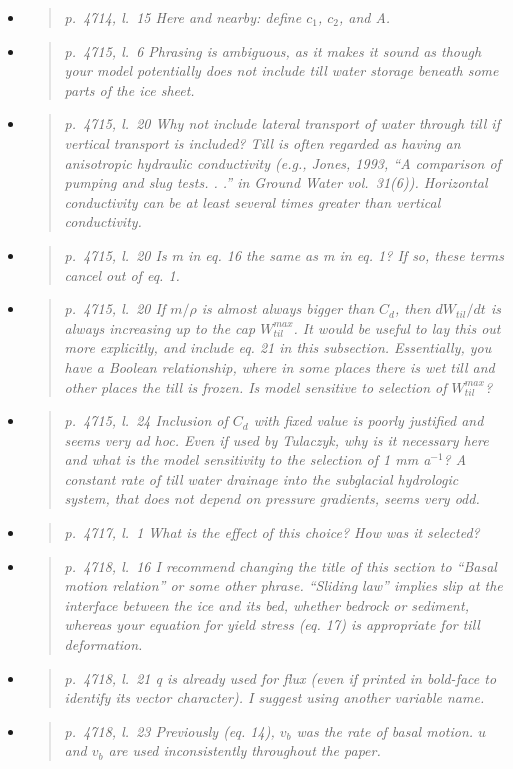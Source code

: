 \documentclass[11pt,reqno]{amsart}
\newcommand{\reply}[2]{
\medskip\medskip
\item  \begin{quote}
\emph{#1}
\end{quote}

\medskip
\noindent #2}
\begin{document}
\begin{itemize}
\reply{p.~4714, l.~15 Here and nearby: define $c_1$, $c_2$, and A.}
{}

\reply{p.~4715, l.~6 Phrasing is ambiguous, as it makes it sound as though your model
potentially does not include till water storage beneath some parts of the ice sheet.}
{}

\reply{p.~4715, l.~20 Why not include lateral transport of water through till if vertical transport
is included? Till is often regarded as having an anisotropic hydraulic conductivity (e.g.,
Jones, 1993, ``A comparison of pumping and slug tests. . .'' in Ground Water vol.~31(6)).
Horizontal conductivity can be at least several times greater than vertical conductivity.}
{}

\reply{p.~4715, l.~20 Is m in eq. 16 the same as m in eq. 1? If so, these terms cancel out of
eq. 1.}
{}

\reply{p.~4715, l.~20 If $m/\rho$ is almost always bigger than $C_d$, then $dW_{til}/dt$ is always
increasing up to the cap $W_{til}^{max}$. It would be useful to lay this out more explicitly,
and include eq. 21 in this subsection. Essentially, you have a Boolean relationship,
where in some places there is wet till and other places the till is frozen. Is model
sensitive to selection of $W_{til}^{max}$?}
{}

\reply{p.~4715, l.~24 Inclusion of $C_d$ with fixed value is poorly justified and seems very
ad hoc. Even if used by Tulaczyk, why is it necessary here and what is the model
sensitivity to the selection of 1 mm a$^{-1}$? A constant rate of till water drainage into the
subglacial hydrologic system, that does not depend on pressure gradients, seems very
odd.}
{}

\reply{p.~4717, l.~1 What is the effect of this choice? How was it selected?}
{}

\reply{p.~4718, l.~16 I recommend changing the title of this section to ``Basal motion relation''
or some other phrase. ``Sliding law'' implies slip at the interface between the ice and its
bed, whether bedrock or sediment, whereas your equation for yield stress (eq. 17) is
appropriate for till deformation.}
{}

\reply{p.~4718, l.~21 q is already used for flux (even if printed in bold-face to identify its vector
character). I suggest using another variable name.}
{}

\reply{p.~4718, l.~23 Previously (eq. 14), $v_b$ was the rate of basal motion. $u$ and $v_b$ are
used inconsistently throughout the paper.}
{}


\end{itemize}
\end{document}
